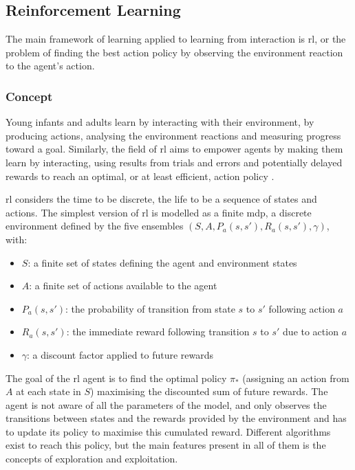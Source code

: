 \subsection{Reinforcement Learning}

The main framework of learning applied to learning from interaction is \acrlong{rl}, or the problem of finding the best action policy by observing the environment reaction to the agent's action.

\subsubsection{Concept} 
	Young infants and adults learn by interacting with their environment, by producing actions, analysing the environment reactions and measuring progress toward a goal. Similarly, the field of \acrfull{rl} aims to empower agents by making them learn by interacting, using results from trials and errors and potentially delayed rewards to reach an optimal, or at least efficient, action policy \citep{sutton1998reinforcement}. 

	\gls{rl} considers the time to be discrete, the life to be a sequence of states and actions. The simplest version of \gls{rl} is modelled as a finite \acrfull{mdp}, a discrete environment defined by the five ensembles $(S, A, P_a(s,s'), R_a(s,s'), \gamma)$, with:
	\begin{itemize}
		\item $S$: a finite set of states defining the agent and environment states
		\item $A$: a finite set of actions available to the agent
		\item $P_a(s,s')$: the probability of transition from state $s$ to $s'$ following action $a$
		\item $R_a(s,s')$: the immediate reward following transition $s$ to $s'$ due to action $a$
		\item $\gamma$: a discount factor applied to future rewards
	\end{itemize}
	
	The goal of the \gls{rl} agent is to find the optimal policy $\pi_*$ (assigning an action from $A$ at each state in $S$) maximising the discounted sum of future rewards. The agent is not aware of all the parameters of the model, and only observes the transitions between states and the rewards provided by the environment and has to update its policy to maximise this cumulated reward. Different algorithms exist to reach this policy, but the main features present in all of them is the concepts of exploration and exploitation.
	
